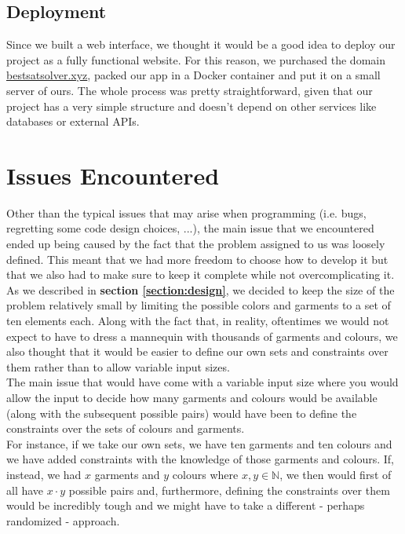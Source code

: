 \documentclass[12pt]{article}
\begin{document}
    \subsection{Deployment}
        Since we built a web interface, we thought it would be a good idea to deploy our project as a fully functional website. 
        For this reason, we purchased the domain \url{bestsatsolver.xyz}, packed our app in a Docker container and put it on a small server of ours.
        The whole process was pretty straightforward, given that our project has a very simple structure and doesn't depend on other services like databases or external APIs.

\newpage

\section{Issues Encountered}
\label{section:issues}

Other than the typical issues that may arise when programming (i.e. bugs, regretting some code design choices, ...), the main issue that we encountered ended up being caused by the fact that the problem assigned to us was loosely defined. This meant that we had more freedom to choose how to develop it but that we also had to make sure to keep it complete while not overcomplicating it.\\

As we described in \textbf{section \ref{section:design}}, we decided to keep the size of the problem relatively small by limiting the possible colors and garments to a set of ten elements each. Along with the fact that, in reality, oftentimes we would not expect to have to dress a mannequin with thousands of garments and colours, we also thought that it would be easier to define our own sets and constraints over them rather than to allow variable input sizes.\\

The main issue that would have come with a variable input size where you would allow the input to decide how many garments and colours would be available (along with the subsequent possible pairs) would have been to define the constraints over the sets of colours and garments.\\

For instance, if we take our own sets, we have ten garments and ten colours and we have added constraints with the knowledge of those garments and colours.
If, instead, we had $x$ garments and $y$ colours where $x, y \in \mathbb{N}$, we then would first of all have $x \cdot y$ possible pairs and, furthermore, defining the constraints over them would be incredibly tough and we might have to take a different - perhaps randomized - approach.\\
\end{document}

